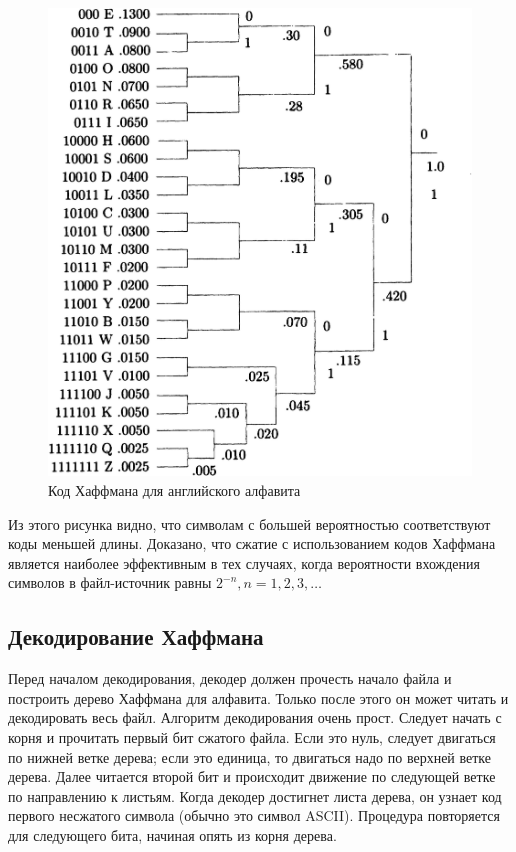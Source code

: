 \begin{figure}[h]
  \centering
  \includegraphics[width=150mm]{pic/huffman_en.jpg}
  \caption{Код Хаффмана для английского алфавита}
  \label{pic:huffman_en}
\end{figure}

Из этого рисунка видно, что символам с большей вероятностью соответствуют
коды меньшей длины. Доказано, что сжатие с использованием кодов Хаффмана
является наиболее эффективным в тех случаях, когда вероятности вхождения символов
в файл-источник равны $ 2^{-n}, n=1,2,3,\dots $ 

\subsection{Декодирование Хаффмана}
\label{ssec:huffman_decode}

Перед началом декодирования, декодер должен прочесть начало 
файла и построить дерево Хаффмана для алфавита.
Только после этого он может читать и декодировать весь файл.
Алгоритм декодирования очень прост.
Следует начать с корня и прочитать первый бит сжатого файла.
Если это нуль, следует двигаться по нижней ветке дерева;
если это единица, то двигаться надо по верхней ветке дерева.
Далее читается второй бит и происходит движение по следующей
ветке по направлению к листьям. Когда декодер достигнет листа
дерева, он узнает код первого несжатого символа 
(обычно это символ ASCII).
Процедура повторяется для следующего бита, начиная опять из корня дерева.

